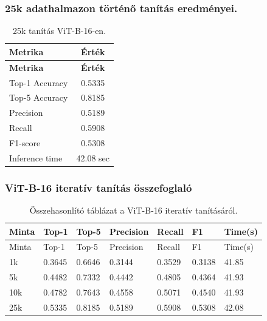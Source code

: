 \subsubsection{25k adathalmazon történő tanítás eredményei.}
  \begin{center}
    \begin{longtable}{l c}
    \caption{25k tanítás ViT-B-16-en.} \label{tab:phase03_ViT-B-16_25k} \\
    \toprule
    \textbf{Metrika} & \textbf{Érték} \\
    \midrule
    \endfirsthead
    \toprule
    \textbf{Metrika} & \textbf{Érték} \\
    \midrule
    \endhead
    Top-1 Accuracy & 0.5335 \\
    Top-5 Accuracy & 0.8185 \\
    Precision      & 0.5189 \\
    Recall         & 0.5908 \\
    F1-score       & 0.5308 \\
    Inference time & 42.08 sec \\
    \bottomrule
    \end{longtable}
  \end{center}

\subsubsection{ViT-B-16 iteratív tanítás összefoglaló}
  \begin{center}
    \begin{longtable}{lllllll}
    \caption{Összehasonlító táblázat a ViT-B-16 iteratív tanításáról.}\label{tab:phase3_ViT-B-16_summary_table}\\
    \toprule
    Minta & Top-1 & Top-5 & Precision & Recall & F1 & Time(s) \\
    \midrule
    \endfirsthead
    \toprule
    Minta & Top-1 & Top-5 & Precision & Recall & F1 & Time(s) \\
    \midrule
    \endhead
    1k & 0.3645 & 0.6646 & 0.3144 & 0.3529 & 0.3138 & 41.85 \\
    5k & 0.4482 & 0.7332 & 0.4442 & 0.4805 & 0.4364 & 41.93 \\
    10k & 0.4782 & 0.7643 & 0.4558 & 0.5071 & 0.4540 & 41.93 \\
    25k & 0.5335 & 0.8185 & 0.5189 & 0.5908 & 0.5308 & 42.08 \\
    \bottomrule
    \end{longtable}
  \end{center}

